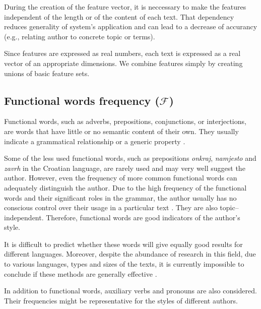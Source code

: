 \documentclass[11pt,english]{article}
\begin{document}
\begin{multicols}{2}
During the creation of the feature vector, it is neccessary to make the
features independent of the length or of the content of each text. That
dependency reduces generality of system's application and can lead to a decrease of accurancy
(e.g., relating author to concrete topic or terms).

Since features are expressed as real numbers, each text is expressed as a real
vector of an appropriate dimensions. We combine features simply by creating unions of basic feature sets.


\subsection{Functional words frequency ($\mathcal{F}$)}
\label{sec:funkcijske-rijeci}
Functional words, such as adverbs, prepositions, conjunctions, or interjections,
are words that have little or no semantic content of their
own. They usually indicate a grammatical relationship or a generic property
\citep{zhao2005effective}.

Some of the less used functional words, such as prepositions \emph{onkraj},
\emph{namjesto} and \emph{zavrh} in the Croatian language, are rarely used and may very well suggest the
author. However, even the frequency of more common functional words can adequately distinguish the author. 
Due to the high frequency of the functional words and their significant roles in the grammar, the author 
usually has no conscious control over their usage in a particular text
\citep{argamon2005measuring}. They are also topic--independent.
Therefore, functional words are good indicators of the author's style.

It is difficult to predict whether these words will give equally good
results for different languages. Moreover, despite the abundance of research in this
field, due to various languages, types and sizes of the texts, it is
currently impossible to conclude if these methods are generally effective \citep{zhao2005effective}.

In addition to functional words, auxiliary verbs and pronouns are also considered.
Their frequencies might be representative for the styles of different authors.


\end{multicols}
\end{document}
